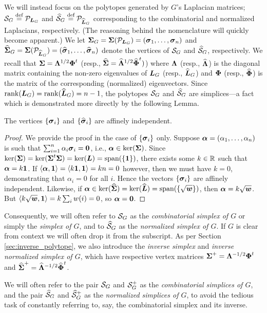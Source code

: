 We will instead focus on the polytopes generated by $G$'s Laplacian matrices;  $\mathcal{S}_G\overset{\text{def}}{=} \mathcal{P}_{\vb*{L}_G}$ and $\widehat{\mathcal{S}}_G\overset{\text{def}}{=} \mathcal{P}_{\widehat{\vb*{L}}_G}$ corresponding to the combinatorial and normalized Laplacians, respectively.  (The reasoning behind the nomenclature will quickly become apparent.)
We let $\boldsymbol{\Sigma}_G=\boldsymbol{\Sigma}(\mathcal{P}_{\vb*{L}_G})=(\vb*{\sigma}_1,\dots,\vb*{\sigma}_n)$ and $\widehat{\boldsymbol{\Sigma}}_G=\boldsymbol{\Sigma}(\mathcal{P}_{\widehat{\vb*{L}}_G})=(\widehat{\vb*{\sigma}}_1,\dots,\widehat{\vb*{\sigma}}_n)$ denote the vertices of $\mathcal{S}_G$ and $\widehat{\mathcal{S}}_G$, respectively. 
We recall that $\boldsymbol{\Sigma}=\vb{\Lambda}^{1/2}\boldsymbol{\Phi}^t$ (resp., $\widehat{\boldsymbol{\Sigma}}=\widehat{\vb{\Lambda}}^{1/2}\widehat{\boldsymbol{\Phi}}^t)$) where $\vb{\Lambda}$ (resp., $\widehat{\vb{\Lambda}}$) is the diagonal matrix containing the non-zero eigenvalues of $\vb*{L}_G$ (resp., $\widehat{\vb*{L}}_G$) and $\boldsymbol{\Phi}$ (resp., $\widehat{\boldsymbol{\Phi}}$) is the matrix of the corresponding (normalized) eigenvectors. 
Since $\rank(\vb*{L}_G)=\rank(\widehat{\vb*{L}}_G)=n-1$, the polytopes $\mathcal{S}_G$ and $\widehat{\mathcal{S}}_G$ are simplices---a fact which is demonstrated more directly by the following Lemma.  

\begin{lemma}
\label{lem:sv_affine_indep}
The vertices $\{\vb*{\sigma}_i\}$  and $\{\widehat{\vb*{\sigma}}_i\}$ are affinely independent. 
\end{lemma}
\begin{proof}
	We provide the proof in the case of $\{\vb*{\sigma}_i\}$ only. 
	Suppose $\vb*{\alpha} = (\alpha_1,\dots,\alpha_n)$ is such that 
$\sum_{i=1}^n \alpha_i\vb*{\sigma}_i = \vb{0}$, i.e., $\vb*{\alpha}\in\ker(\boldsymbol{\Sigma})$. Since $\ker(\boldsymbol{\Sigma})=\ker(\boldsymbol{\Sigma}^t\boldsymbol{\Sigma})=\ker(\vb*{L})=\textnormal{span}(\{\vb{1}\})$, there exists some $k\in \mathbb{R}$ such that $\vb*{\alpha}=k\vb{1}$. If $\langle \vb*{\alpha},\vb{1}\rangle = \langle k\vb{1},\vb{1}\rangle=kn=0$ however, then we must have $k=0$, demonstrating that $\alpha_i=0$ for all $i$. Hence the vectors $\{\vb*{\sigma}_i\}$ are affinely independent. Likewise, if $\vb*{\alpha}\in\ker(\widehat{\boldsymbol{\Sigma}})=\ker(\widehat{\vb*{L}})=\textnormal{span}(\{\sqrt{\vb*{w}}\})$, then $\vb*{\alpha}=k\sqrt{\vb*{w}}$. But $\langle k\sqrt{\vb*{w}},\vb{1}\rangle = k\sum_{i}w(i)=0$, so $\vb*{\alpha}=\vb{0}$. 
\end{proof}

Consequently, we will often refer to $\mathcal{S}_G$ as the \emph{combinatorial simplex of $G$} or simply the \emph{simplex of $G$}, and to $\widehat{\mathcal{S}}_G$ as the \emph{normalized simplex of $G$}. If $G$ is clear from context we will often drop it from the subscript. As per Section \ref{sec:inverse_polytope}, we also introduce the \emph{inverse simplex} and \emph{inverse normalized simplex of $G$}, which have respective vertex matrices $\boldsymbol{\Sigma}^+ = \vb{\Lambda}^{-1/2}\boldsymbol{\Phi}^t$ and $\widehat{\boldsymbol{\Sigma}}^+ = \widehat{\vb{\Lambda}}^{-1/2}\widehat{\boldsymbol{\Phi}}^t$.  

We will often refer to the pair $\mathcal{S}_G$ and $\mathcal{S}_G^+$ as the \emph{combinatorial simplices of $G$}, and the pair $\widehat{\mathcal{S}}_G$ and $\widehat{\mathcal{S}}_G^+$ as the \emph{normalized simplices of $G$}, to avoid the tedious task of constantly referring to, say, the combinatorial simplex and its inverse. 

